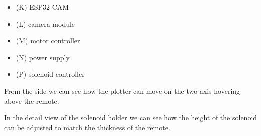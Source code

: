 \begin{minipage}[t]{0.5\textwidth}
    \begin{itemize}
        \item (K) ESP32-CAM
        \item (L) camera module
        \item (M) motor controller
        \item (N) power supply
        \item (P) solenoid controller
    \end{itemize}
    \vspace{5mm}

    From the side we can see how the plotter can move on the two axis hovering above the remote.
\end{minipage}
\begin{minipage}[t]{0.45\textwidth}
    \centering{}
\end{minipage}\hfill


\begin{minipage}[t]{0.45\textwidth}
    \centering{}
\end{minipage}\hfill
\begin{minipage}[t]{0.5\textwidth}
    \vspace{5mm}
    In the detail view of the solenoid holder we can see how the height of the solenoid can be adjusted to match the thickness of the remote.
\end{minipage}



